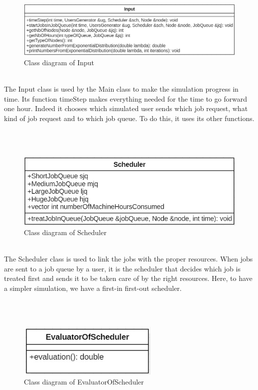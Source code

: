 \documentclass [10 pt, a4 paper]{report}
\begin{document}
\clearpage

\begin{figure}[!htbp]
\centering
\includegraphics[width=1.3\textwidth]{Input.jpg}
\caption{\label{fig:image} Class diagram of Input}
\end{figure}
\\

\noindent
The Input class is used by the Main class to make the simulation progress in time. Its function timeStep makes everything needed for the time to go forward one hour. Indeed it chooses which simulated user sends which job request, what kind of job request and to which job queue. To do this, it uses its other functions.

\\ \\

\begin{figure}[!htbp]
\centering
\includegraphics[width=\textwidth]{Sch.jpg}
\caption{\label{fig:image} Class diagram of Scheduler}
\end{figure}
\\

\noindent
The Scheduler class is used to link the jobs with the proper resources. When jobs are sent to a job queue by a user, it is the scheduler that decides which job is treated first and sends it to be taken care of by the right resources. Here, to have a simpler simulation, we have a first-in first-out scheduler.

\\ \\

\begin{figure}[!htbp]
\centering
\includegraphics[width=0.6\textwidth]{EvalOfSch.jpg}
\caption{\label{fig:image} Class diagram of EvaluatorOfScheduler}
\end{figure}
\\
\end{document}
